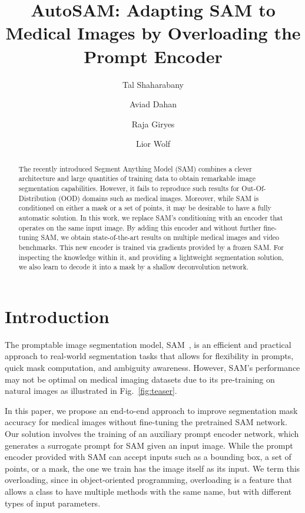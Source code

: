 \documentclass[runningheads]{llncs}
\begin{document}
\title{AutoSAM: Adapting SAM to Medical Images by Overloading the Prompt Encoder}


\author{Tal Shaharabany \and
Aviad Dahan \and
Raja Giryes \and Lior Wolf}


\maketitle

\begin{abstract}
The recently introduced Segment Anything Model (SAM) combines a clever architecture and large quantities of training data to obtain remarkable image segmentation capabilities. However, it fails to reproduce such results for Out-Of-Distribution (OOD) domains such as medical images. Moreover, while SAM is conditioned on either a mask or a set of points, it may be desirable to have a fully automatic solution. In this work, we replace SAM's conditioning with an encoder that operates on the same input image. By adding this encoder and without further fine-tuning SAM, we obtain state-of-the-art results on multiple medical images and video benchmarks. This new encoder is trained via gradients provided by a frozen SAM. For inspecting the knowledge within it, and providing a lightweight segmentation solution, we also learn to decode it into a mask by a shallow deconvolution network.  
\end{abstract}

\section{Introduction}


The promptable image segmentation model, SAM~\cite{kirillov2023segment}, is an efficient and practical approach to real-world segmentation tasks that allows for flexibility in prompts, quick mask computation, and ambiguity awareness. However, SAM's performance may not be optimal on medical imaging datasets due to its pre-training on natural images as illustrated in Fig.~\ref{fig:teaser}.

In this paper, we propose an end-to-end approach to improve segmentation mask accuracy for medical images without fine-tuning the pretrained SAM network. Our solution involves the training of an auxiliary prompt encoder network, which generates a surrogate prompt for SAM given an input image. While the prompt encoder provided with SAM can accept inputs such as a bounding box, a set of points, or a mask, the one we train has the image itself as its input. 
We term this overloading, since in object-oriented programming, overloading is a feature that allows a class to have multiple methods with the same name, but with different types of input parameters. 
\end{document}
